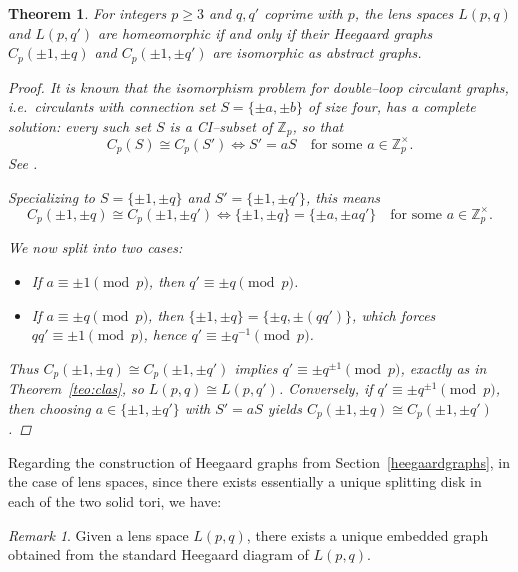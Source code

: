 \documentclass[pdflatex,sn-mathphys-num]{sn-jnl}%
\theoremstyle{plain}
\newtheorem{theorem}{Theorem}
\theoremstyle{definition}
\theoremstyle{remark}
\newtheorem*{remark}{Remark}
\newcommand{\red}[1]{\color{red}{#1}}
\begin{document}
\begin{theorem}\label{thm:lens-circulant-abstract}
For integers $p\ge 3$ and $q,q'$ coprime with $p$, 
the lens spaces $L(p,q)$ and $L(p,q')$ are homeomorphic 
if and only if their Heegaard graphs $C_p(\pm 1,\pm q)$ and $C_p(\pm 1,\pm q')$ are isomorphic as abstract graphs. 

\begin{proof}
It is known that the isomorphism problem for 
double--loop circulant graphs, i.e.\ circulants with connection set 
$S=\{\pm a,\pm b\}$ of size four, has a complete solution: 
every such set $S$ is a CI--subset of $\mathbb{Z}_p$, so that
\[
C_p(S)\cong C_p(S') \iff S' = aS \quad \text{for some } a\in \mathbb{Z}_p^\times.
\]
See \cite[Thm.~5.4]{muzychuk}.

Specializing to $S=\{\pm 1,\pm q\}$ and $S'=\{\pm 1,\pm q'\}$, 
this means
\[
C_p(\pm 1,\pm q)\cong C_p(\pm 1,\pm q') \iff 
\{\pm 1,\pm q\} = \{\pm a,\pm aq'\}
\quad \text{for some } a\in \mathbb{Z}_p^\times.
\]

We now split into two cases:
\begin{itemize}
\item If $a\equiv \pm 1 \pmod p$, then $q'\equiv \pm q \pmod p$.
\item If $a\equiv \pm q \pmod p$, then 
$\{\pm 1,\pm q\}=\{\pm q,\pm(qq')\}$, which forces 
$qq'\equiv \pm 1\pmod p$, hence $q'\equiv \pm q^{-1}\pmod p$.
\end{itemize}

Thus $C_p(\pm 1,\pm q)\cong C_p(\pm 1,\pm q')$ implies 
$q'\equiv \pm q^{\pm 1}\pmod p$, exactly as in 
Theorem~\ref{teo:clas}, so $L(p,q)\cong L(p,q')$. 
Conversely, if $q'\equiv \pm q^{\pm 1}\pmod p$, then 
choosing $a\in\{\pm 1,\pm q'\}$ with $S'=aS$ yields 
$C_p(\pm 1,\pm q)\cong C_p(\pm 1,\pm q')$. 
\end{proof}
\end{theorem}

Regarding the construction of Heegaard graphs from Section~\ref{heegaardgraphs}, in the case of lens spaces, since there exists essentially a unique splitting disk in each of the two solid tori, we have:

\begin{remark}
Given a lens space $L(p,q)$, there exists a unique embedded graph obtained from the standard Heegaard diagram of  $L(p,q)$. 
\end{remark}
\end{document}
